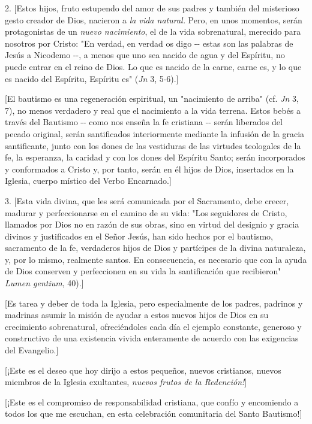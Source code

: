 \begin{body}
2. {[}Estos hijos, fruto estupendo del amor de sus padres y también del misterioso gesto creador de Dios, nacieron a \emph{la vida natural.} Pero, en unos momentos, serán protagonistas de un \emph{nuevo nacimiento}, el de la vida sobrenatural, merecido para nosotros por Cristo: "En verdad, en verdad os digo -\/- estas son las palabras de Jesús a Nicodemo -\/-, a menos que uno sea nacido de agua y del Espíritu, no puede entrar en el reino de Dios. Lo que es nacido de la carne, carne es, y lo que es nacido del Espíritu, Espíritu es" (\emph{Jn} 3, 5-6).{]}

{[}El bautismo es una regeneración espiritual, un "nacimiento de arriba" (cf. \emph{Jn} 3, 7), no menos verdadero y real que el nacimiento a la vida terrena. Estos bebés a través del Bautismo -\/- como nos enseña la fe cristiana -\/- serán liberados del pecado original, serán santificados interiormente mediante la infusión de la gracia santificante, junto con los dones de las vestiduras de las virtudes teologales de la fe, la esperanza, la caridad y con los dones del Espíritu Santo; serán incorporados y conformados a Cristo y, por tanto, serán en él hijos de Dios, insertados en la Iglesia, cuerpo místico del Verbo Encarnado.{]}

3. {[}Esta vida divina, que les será comunicada por el Sacramento, debe crecer, madurar y perfeccionarse en el camino de su vida: "Los seguidores de Cristo, llamados por Dios no en razón de sus obras, sino en virtud del designio y gracia divinos y justificados en el Señor Jesús, han sido hechos por el bautismo, sacramento de la fe, verdaderos hijos de Dios y partícipes de la divina naturaleza, y, por lo mismo, realmente santos. En consecuencia, es necesario que con la ayuda de Dios conserven y perfeccionen en su vida la santificación que recibieron" \emph{Lumen gentium}, 40).{]}

{[}Es tarea y deber de toda la Iglesia, pero especialmente de los padres, padrinos y madrinas asumir la misión de ayudar a estos nuevos hijos de Dios en su crecimiento sobrenatural, ofreciéndoles cada día el ejemplo constante, generoso y constructivo de una existencia vivida enteramente de acuerdo con las exigencias del Evangelio.{]}

{[}¡Este es el deseo que hoy dirijo a estos pequeños, nuevos cristianos, nuevos miembros de la Iglesia exultantes, \emph{nuevos frutos de la Redención!}{]}

{[}¡Este es el compromiso de responsabilidad cristiana, que confío y encomiendo a todos los que me escuchan, en esta celebración comunitaria del Santo Bautismo!{]}


\end{body}

